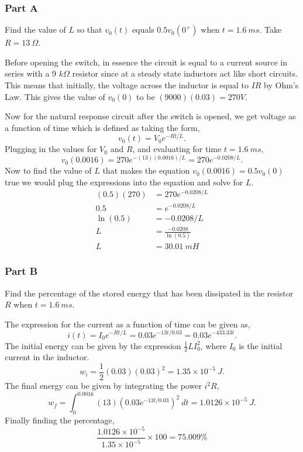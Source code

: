 \documentclass[12pt]{article}
\begin{document}
    \subsubsection*{Part A} Find the value of $L$ so that $v_0(t)$ equals $0.5v_0(0^{+})$ when $t = 1.6\ ms$. Take $R = 13\ \Omega$. \\
    \par Before opening the switch, in essence the circuit is equal to a current source in series with a 9 $k\Omega$ resistor since at a steady state inductors act like short circuits. This means that initially, the voltage across the inductor is equal to $IR$ by Ohm's Law. This gives the value of $v_0(0)$ to be $(9000)(0.03) = 270 V$.
    \par Now for the natural response circuit after the switch is opened, we get voltage as a function of time which is defined as taking the form,
    \[
        v_0(t) = V_0e^{-Rt / L}.
    \]
    Plugging in the values for $V_0$ and $R$, and evaluating for time $t = 1.6\ ms$,
    \[
        v_0(0.0016) = 270e^{-(13)(0.0016) / L} = 270e^{-0.0208 / L}.
    \]
    Now to find the value of $L$ that makes the equation $v_0(0.0016) = 0.5v_0(0)$ true we would plug the expressions into the equation and solve for $L$.
    \begin{align*}
        (0.5)(270) &= 270e^{-0.0208 / L} \\
        0.5 &= e^{-0.0208 / L} \\
        \ln(0.5) &= -0.0208 / L \\
        L &= \frac{-0.0208}{\ln(0.5)} \\
        L &= \boxed{30.01\ mH}
    \end{align*}
    \subsubsection*{Part B} Find the percentage of the stored energy that has been dissipated in the resistor $R$ when $t = 1.6\ ms$. \\
    \par The expression for the current as a function of time can be given as,
    \[
        i(t) = I_0e^{-Rt / L} = 0.03e^{-13t / 0.03} = 0.03e^{-433.33t}.
    \]
    The initial energy can be given by the expression $\frac{1}{2} L I_0^2$, where $I_0$ is the initial current in the inductor.
    \[
        w_i = \frac{1}{2} (0.03) (0.03)^2 = 1.35 \times 10^{-5}\ J.
    \]
    The final energy can be given by integrating the power $i^2R$,
    \[
        w_f = \int_0^{0.0016} (13) (0.03e^{-13t / 0.03})^2\ dt = 1.0126 \times 10^{-5}\ J.
    \]
    Finally finding the percentage,
    \[
        \frac{1.0126 \times 10^{-5}}{1.35 \times 10^{-5}} \times 100 =
        \boxed{75.009\%}
    \]
\end{document}
